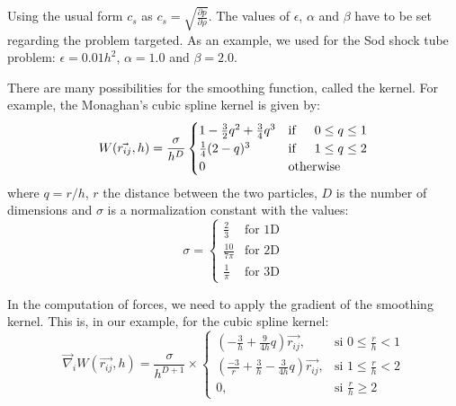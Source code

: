 Using the usual form $c_s$ as $c_s = \sqrt{\frac{\partial p}{\partial \rho}}$.
The values of $\epsilon$, $\alpha$ and $\beta$ have to be set regarding the problem targeted. 
As an example, we used for the Sod shock tube problem: $\epsilon = 0.01h^2$, $\alpha = 1.0$ and $\beta = 2.0$. 


There are many possibilities for the smoothing function, called the kernel. 
For example, the Monaghan's cubic spline kernel is given by:
\begin{equation}
W(\vec{r_{ij}},h) = \frac{\sigma}{h^D} \begin{cases}
1-\frac{3}{2} q^2 + \frac{3}{4} q^3 & \text{if} \indent 0 \leq q \leq 1 \\
\frac{1}{4} (2-q)^3  & \text{if} \indent 1 \leq q \leq 2 \\
0 & \text{otherwise}
\end{cases}
\end{equation}
where $q = r/h$, $r$ the distance between the two particles, $D$ is the number of dimensions and $\sigma$ is a normalization constant with the values:
\begin{equation}
\sigma =  \begin{cases}
\frac{2}{3} & \text{for 1D}  \\
\frac{10}{7 \pi} & \text{for 2D} \\
\frac{1}{\pi} & \text{for 3D}
\end{cases}
\end{equation}

In the computation of forces, we need to apply the gradient of the smoothing kernel. 
This is, in our example, for the cubic spline kernel:
\begin{equation}
 \vec{\nabla}_iW(\vec{r_{ij}},h) = \frac{\sigma}{h^{D+1}} \times \begin{cases} ( -\frac{3}{h} + \frac{9}{4h}q) \vec{r_{ij}}, & \mbox{si } 0 \leq \frac{r}{h} < 1 \\ (\frac{-3}{r} + \frac{3}{h} - \frac{3}{4h}q ) \vec{r_{ij}}, & \mbox{si } 1 \leq \frac{r}{h} < 2\\ 0, & \mbox{si } \frac{r}{h} \geq 2 \end{cases}
\end{equation}

